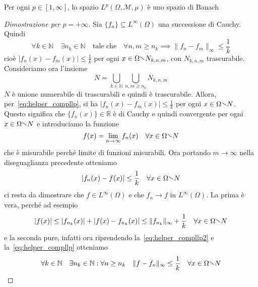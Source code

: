 \begin{theorem}[\(L^p\) è Banach ]\label{thm:completezza_Lp}
    Per ogni \(p \in [1, \infty]\), lo spazio \(L^{p}(\Omega, \mathcal{M},
    \mu)\) è uno spazio di Banach
\end{theorem}
\begin{proof}[Dimostrazione per \(p=+\infty\)]
    Sia \(\{f_{n}\} \subseteq L^{\infty}{(\Omega)} \) una successione di Cauchy.
    Quindi 
    \begin{equation}\label{eq:helper_compllp}
        \forall k \in \mathbb{N} \quad \exists n_k \in \mathbb{N} \quad
        \text{tale che} \quad \forall n, m \ge n_k \implies \|f_{n} -
        f_{m}\|_\infty \le  \frac{1}{k}
    \end{equation}
    cioè \(|f_{n}{(x)} - f_{m}{(x)}| \le \frac{1}{k}\) per ogni \(x \in \Omega
    \sminus N_{k, n, m} \), con \(N_{k, n, m} \) trascurabile. Consideriamo ora
    l'insieme
    \[
        N = \bigcup_{k \in \mathbb{N}} \bigcup_{n, m \ge n_k} N_{k, n, m}
    \]
    \(N\) è unione numerabile di trascurabili e quindi è trascurabile.
    Allora, per~\eqref{eq:helper_compllp}, si ha \(|f_{n}{(x)} - f_{m}{(x)}| \le
    \frac{1}{k}\) per ogni \(x \in
    \Omega \sminus N\).
    Questo significa che \(\{f_{n}{(x)}\} \in \mathbb{R}\) è di Cauchy e quindi
    convergente per ogni \(x \in \Omega \sminus N\) e introduciamo la funzione
    \[
        f(x) = \lim_{n\to \infty} f_{n}{(x)} \quad \forall x \in \Omega \sminus N
    \]
    che è misurabile perché limite di funzioni misurabili. Ora portando \(m \to
    \infty\) nella diseguaglianza precedente otteniamo
    \begin{equation}\label{eq:helper_compllp2}
        |f_{n}{(x)} - f{(x)}| \le \frac{1}{k} \quad \forall x \in \Omega \sminus N
    \end{equation}
    ci resta da dimostrare che \(f \in L^{\infty}(\Omega)\) e che \(f_{n} \to
    f\) in \(L^{\infty}{(\Omega)}\). La prima è vera, perché ad esempio
    \[
        |f{(x)}| \le |f_{n_k}{(x)}| + |f{(x)} - f_{n_k} {(x)}| \le \|f_{n_k}\|_\infty +
        \frac{1}{k} \quad \forall x \in \Omega \sminus N
    \]
    e la seconda pure, infatti ora riprendendo la~\eqref{eq:helper_compllp2} e
    la~\eqref{eq:helper_compllp} otteniamo
    \[
        \forall k \in \mathbb{N} \quad \exists n_k \in \mathbb{N} : \forall n
        \ge n_k \quad \|f - f_{n}\|_\infty \le \frac{1}{k} \quad \forall x \in \Omega \sminus N
    \]
    
\end{proof}
